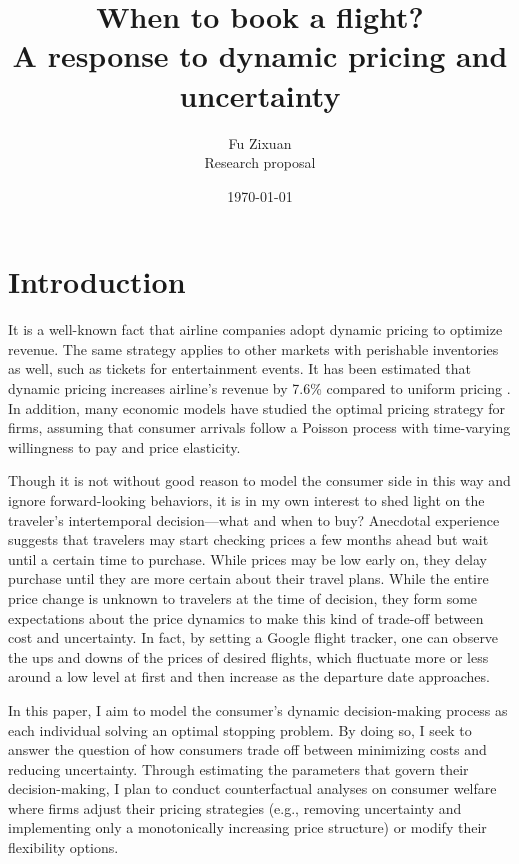 \documentclass[12pt]{article}
\title{When to book a flight?\\{\large {A response to dynamic pricing and uncertainty}}}
\author{Fu Zixuan \\{\small {Research proposal}}}
\date{\today}
\begin{document}
\maketitle




\section{Introduction}
It is a well-known fact that airline companies adopt dynamic pricing to
optimize revenue. The same strategy applies to other markets with perishable
inventories as well, such as tickets for entertainment events. It has been
estimated that dynamic pricing increases airline's revenue by 7.6\% compared to
uniform pricing \citep{williams2022welfare}. In addition, many economic models
have studied the optimal pricing strategy for firms, assuming that consumer
arrivals follow a Poisson process with time-varying willingness to pay and
price elasticity.

Though it is not without good reason to model the consumer side in this way and
ignore forward-looking behaviors, it is in my own interest to shed light on the
traveler's intertemporal decision—what and when to buy? Anecdotal experience
suggests that travelers may start checking prices a few months ahead but wait
until a certain time to purchase. While prices may be low early on, they delay
purchase until they are more certain about their travel plans. While the entire
price change is unknown to travelers at the time of decision, they form some
expectations about the price dynamics to make this kind of trade-off between
cost and uncertainty. In fact, by setting a Google flight tracker, one can
observe the ups and downs of the prices of desired flights, which fluctuate
more or less around a low level at first and then increase as the departure
date approaches.

In this paper, I aim to model the consumer's dynamic decision-making process as
each individual solving an optimal stopping problem. By doing so, I seek to
answer the question of how consumers trade off between minimizing costs and
reducing uncertainty. Through estimating the parameters that govern their
decision-making, I plan to conduct counterfactual analyses on consumer welfare
where firms adjust their pricing strategies (e.g., removing uncertainty and
implementing only a monotonically increasing price structure) or modify their
flexibility options.
\end{document}
